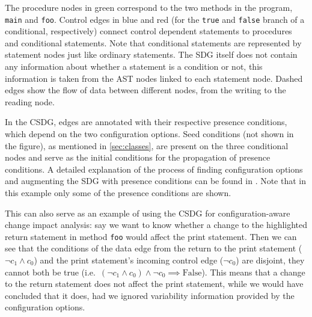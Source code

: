 The procedure nodes in green correspond to the two methods in the program, \lstinline|main| and \lstinline|foo|. 
Control edges in blue and red (for the \lstinline|true| and \lstinline|false| branch of a conditional, respectively) 
connect control dependent statements to procedures and conditional statements. Note that conditional statements are 
represented by statement nodes just like ordinary statements. The SDG itself does not contain any information about 
whether a statement is a condition or not, this information is taken from the AST nodes linked to each statement node. 
Dashed edges show the flow of data between different nodes, from the writing to the reading node.

In the CSDG, edges are annotated with their respective presence conditions, which depend on the two configuration 
options. Seed conditions (not shown in the figure), as mentioned in \autoref{sec:classes}, are present on the three 
conditional nodes and serve as the initial conditions for the propagation of presence conditions. A detailed 
explanation of the process of finding configuration options and augmenting the SDG with presence conditions can be 
found in \cite{DBLP:conf/kbse/AngererGPG15}. Note that in this example only some of the presence conditions are shown.

This can also serve as an example of using the CSDG for configuration-aware change impact analysis: say we want to know 
whether a change to the highlighted return statement in method \lstinline|foo| would affect the print statement. Then 
we can see that the conditions of the data edge from the return to the print statement ($ \lnot c_1 \land c_0 $) and 
the print statement's incoming control edge ($ \lnot c_0 $) are disjoint, they cannot both be true
(i.e.\ $ \left( \lnot c_1 \land c_0 \right) \land \lnot c_0 \implies \text{False} $). This means that a change to the 
return statement does not affect the print statement, while we would have concluded that it does, had we ignored 
variability information provided by the configuration options.


